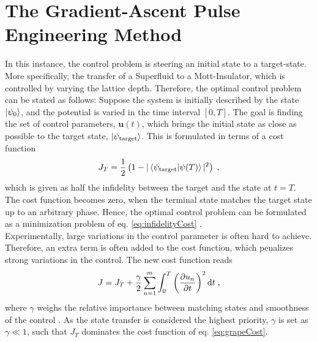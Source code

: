 \section{The Gradient-Ascent Pulse Engineering Method}
In this instance, the control problem is steering an initial state to a target-state. More specifically, the transfer of a Superfluid to a Mott-Insulator, which is controlled by varying the lattice depth. Therefore, the optimal control problem can be stated as follows: 
Suppose the system is initially described by the state $\ket{\psi_0}$, and the potential is varied in the time interval $[ 0 , T]$. The goal is finding the set of control parameters, $\boldsymbol{u}(t)$, which brings the initial state as close as possible to the target state, $\ket{\psi_{\mathrm{target}}}$. This is formulated in terms of a cost function
\begin{equation}
	J_T = \frac{1}{2} \left( 1-|\braket{\psi_{\mathrm{target}} | \psi (T)}|^2 \right) \; ,
	\label{eq:infidelityCost}
\end{equation}
which is given as half the infidelity between the target and the state at $t=T$. The cost function becomes zero, when the terminal state matches the target state up to an arbitrary phase. Hence, the optimal control problem can be formulated as a minimization problem of eq. \eqref{eq:infidelityCost} \cite{Jager2014}.\\
Experimentally, large variations in the control parameter is often hard to achieve. Therefore, an extra term is often added to the cost function, which penalizes strong variations in the control. The new cost function reads
\begin{equation}
	J = J_T + \frac{\gamma}{2} \sum_{n=1}^{m} \int_{0}^{T} \left( \pdv{u_n}{t} \right)^2 \mathrm{d}t \; ,
	\label{eq:grapeCost}
\end{equation}
where $\gamma$ weighs the relative importance between matching states and smoothness of the control \cite{Jager2014}. As the state transfer is considered the highest priority, $\gamma$ is set as $\gamma \ll 1$, such that $J_T$ dominates the cost function of eq. \eqref{eq:grapeCost}.\\

